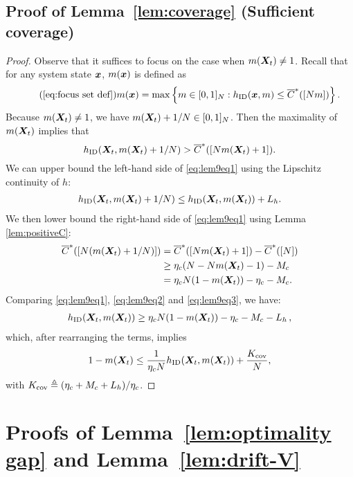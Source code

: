 \subsection{Proof of Lemma~\ref{lem:coverage} (Sufficient coverage)}
\begin{proof}
    Observe that it suffices to focus on the case when $m({\bm{X}}_t) \neq 1$. 
    Recall that for any system state $\bm{x}$, $m(\bm{x})$ is defined as 
    \begin{align}\tag{\ref{eq:focus set def}}
        m(\mx)= \max \sets{ m\in[0,1]_N: h_{\ID}(\mx,m)\leq \rembud([Nm])}. 
    \end{align}
    Because $m({\bm{X}}_t) \neq 1$, we have $m({\bm{X}}_t)+1/N  \in [0,1]_N$. Then the maximality of $m({\bm{X}}_t)$ implies that
    \begin{equation}
    \label{eq:lem9eq1}
        h_{\textnormal{ID}}({\bm{X}}_t,m({\bm{X}}_t)+1/N) > \overline{C}^*([Nm({\bm{X}}_t)+1]). 
    \end{equation}
    We can upper bound the left-hand side of \eqref{eq:lem9eq1} using the Lipschitz continuity of $h$:
    \begin{align}\label{eq:lem9eq2}
        h_{\textnormal{ID}}({\bm{X}}_t,m({\bm{X}}_t)+1/N)\leq h_{\textnormal{ID}}({\bm{X}}_t,m({\bm{X}}_t)) + L_h.
    \end{align}
    We then lower bound the right-hand side of \eqref{eq:lem9eq1} using Lemma \ref{lem:positiveC}: 
    \begin{align}
        \nonumber
        \overline{C}^*([N(m({\bm{X}}_t)+1/N)])
        &=  \overline{C}^*([Nm({\bm{X}}_t)+1]) - \overline{C}^*([N])\\ 
        \nonumber
        &\geq \eta_c(N-Nm({\bm{X}}_t)-1)-M_c \\
        \label{eq:lem9eq3}
        &=\eta_c N(1-m({\bm{X}}_t))-\eta_c - M_c. 
    \end{align}
    Comparing \eqref{eq:lem9eq1}, \eqref{eq:lem9eq2} and \eqref{eq:lem9eq3}, we have:
    \begin{align*}
        h_{\textnormal{ID}}({\bm{X}}_t,m({\bm{X}}_t))\geq \eta_c N(1-m({\bm{X}}_t))-\eta_c - M_c - L_h\,,
    \end{align*}
    which, after rearranging the terms, implies
    \begin{align*}
        1-m({\bm{X}}_t)\leq \frac{1}{\eta_c N}h_{\textnormal{ID}}({\bm{X}}_t,m({\bm{X}}_t))+\frac{K_{\text{cov}}}{N}, 
    \end{align*}
    with $K_{\text{cov}} \triangleq (\eta_c+M_c+L_h)/\eta_c$.
\end{proof}





\section{Proofs of Lemma~\ref{lem:optimality gap} and Lemma~\ref{lem:drift-V}}
\label{sec:proof-lem-main-theorem}

